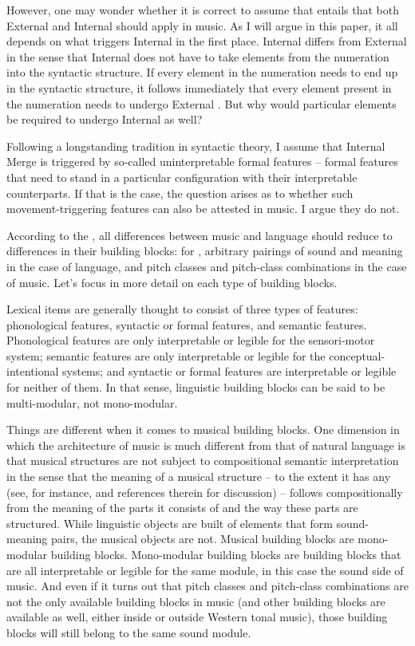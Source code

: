 \documentclass[output=paper]{langsci/langscibook}
\begin{document}
However, one may wonder whether it is correct to assume that  entails that both External and Internal
 should apply in music. As I will argue in this paper, it all
depends on what triggers Internal  in the first place. Internal
 differs from External  in the sense that Internal 
does not have to take elements from the numeration into the syntactic
structure. If every element in the numeration needs to end up in the syntactic
structure, it follows immediately that every element present in the numeration
needs to undergo External . But why would particular elements be
required to undergo Internal  as well?

Following a longstanding tradition in syntactic theory, I assume that Internal
Merge is triggered by so-called uninterpretable formal features -- formal
features that need to stand in a particular configuration with their
interpretable counterparts. If that is the case, the question arises as to
whether such movement-triggering features can also be attested in music. I
argue they do not.

According to the , all differences
between music and language should reduce to differences in their building
blocks: for \citeauthor{KatzPes2011}, arbitrary pairings of sound and meaning
in the case of language, and pitch classes and pitch-class combinations in the
case of music. Let’s focus in more detail on each type of building blocks.

Lexical items are generally thought to consist of three types of features:
phonological features, syntactic or formal features, and semantic features.
Phonological features are only interpretable or legible for the sensori-motor
system; semantic features are only interpretable or legible for the
conceptual-intentional systems; and syntactic or formal features are
interpretable or legible for neither of them. In that sense, linguistic
building blocks can be said to be multi-modular, not mono-modular.

Things are different when it comes to musical building blocks. One dimension in
which the architecture of music is much different from that of natural language
is that musical structures are not subject to compositional semantic
interpretation in the sense that the meaning of a musical structure – to the
extent it has any (see, for instance, \citealt{Schlenker2016} and references
therein for discussion) – follows compositionally from the meaning of the parts
it consists of and the way these parts are structured. While linguistic objects
are built of elements that form sound-meaning pairs, the musical objects are
not. Musical building blocks are mono-modular building blocks. Mono-modular
building blocks are building blocks that are all interpretable or legible for
the same module, in this case the sound side of music. And even if it turns out
that pitch classes and pitch-class combinations are not the only available
building blocks in music (and other building blocks are available as well,
either inside or outside Western tonal music), those building blocks will still
belong to the same sound module.
\end{document}
